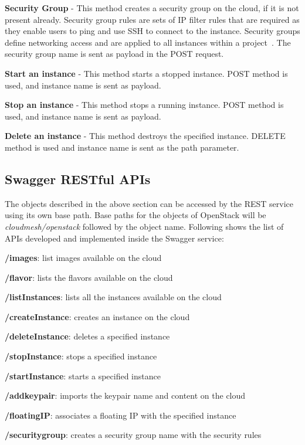 \begin{description}
   \item \textbf{Security Group} - This method creates a security group on the
   cloud, if it is not present already. Security group rules are sets of IP
   filter rules that are required as they enable users to ping and use SSH to
   connect to the instance. Security groups define networking access and are
   applied to all instances within a project~\cite{hid-sp18-516-www-secgroup}.
   The security group name is sent as payload in the POST request. 

   \item \textbf{Start an instance} - This method starts a stopped instance.
   POST method is used, and instance name is sent as payload. 

   \item \textbf{Stop an instance} - This method stops a running instance. POST
   method is used, and instance name is sent as payload. 

   \item \textbf{Delete an instance} - This method destroys the specified
   instance. DELETE method is used and instance name is sent as the path
   parameter. 

\end{description}    

\subsection{Swagger RESTful APIs}
The objects described in the above section can be accessed by the REST service
using its own base path. Base paths for the objects of OpenStack will be
\textit{cloudmesh/openstack} followed by the object name. Following shows the
list of APIs developed and implemented inside the Swagger service:

\begin{description}
\item \textbf{/images}: list images available on the cloud
\item \textbf{/flavor}: lists the flavors available on the cloud
\item \textbf{/listInstances}: lists all the instances available on the cloud
\item \textbf{/createInstance}: creates an instance on the cloud
\item \textbf{/deleteInstance}: deletes a specified instance
\item \textbf{/stopInstance}: stops a specified instance
\item \textbf{/startInstance}: starts a specified instance
\item \textbf{/addkeypair}: imports the keypair name and content on the cloud
\item \textbf{/floatingIP}: associates a floating IP with the specified 
instance
\item \textbf{/securitygroup}: creates a security group name with the security
rules 
\end{description}

